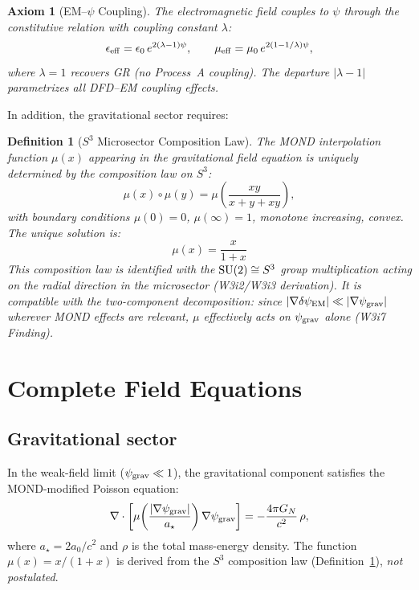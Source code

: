 \documentclass[11pt]{article}
\newtheorem{definition}{Definition}
\newtheorem{axiom}{Axiom}
\newcommand{\psigrav}{\psi_{\rm grav}}
\newcommand{\dpsiEM}{\delta\psi_{\rm EM}}
\newcommand{\GN}{G_N}
\newcommand{\aM}{a_0}
\newcommand{\lamdiff}{|\lambda{-}1|}
\newcommand{\mufd}{\mu}
\begin{document}
\begin{axiom}[EM--$\psi$ Coupling]
\label{ax:coupling}
The electromagnetic field couples to $\psi$ through the constitutive
relation with coupling constant $\lambda$:
\begin{equation}
\epsilon_{\rm eff} = \epsilon_0\,e^{2(\lambda-1)\psi}, \qquad
\mu_{\rm eff} = \mu_0\,e^{2(1-1/\lambda)\psi},
\label{eq:constitutive}
\end{equation}
where $\lambda = 1$ recovers GR (no Process~A coupling). The departure
$\lamdiff$ parametrizes all DFD--EM coupling effects.
\end{axiom}

\noindent In addition, the gravitational sector requires:

\begin{definition}[$S^3$ Microsector Composition Law]
\label{def:S3}
The MOND interpolation function $\mufd(x)$ appearing in the gravitational
field equation is uniquely determined by the composition law on $S^3$:
\begin{equation}
\mufd(x) \circ \mufd(y) = \mufd\!\left(\frac{xy}{x+y+xy}\right),
\end{equation}
with boundary conditions $\mufd(0) = 0$, $\mufd(\infty) = 1$,
monotone increasing, convex. The unique solution is:
\begin{equation}
\boxed{\mufd(x) = \frac{x}{1+x}}
\label{eq:mu-simple}
\end{equation}
This composition law is identified with the ${\rm SU}(2) \cong S^3$
group multiplication acting on the radial direction in the microsector
(W3i2/W3i3 derivation). It is compatible with the two-component
decomposition: since $|\nabla\dpsiEM| \ll |\nabla\psigrav|$ wherever
MOND effects are relevant, $\mufd$ effectively acts on $\psigrav$
alone (W3i7 Finding).
\end{definition}


\section{Complete Field Equations}
\label{sec:field-equations}

\subsection{Gravitational sector}

In the weak-field limit ($\psigrav \ll 1$), the gravitational component
satisfies the MOND-modified Poisson equation:
\begin{equation}
\nabla\cdot\left[\mufd\!\left(\frac{|\nabla\psigrav|}{a_\star}\right)
\nabla\psigrav\right] = -\frac{4\pi\GN}{c^2}\,\rho,
\label{eq:grav-Poisson}
\end{equation}
where $a_\star = 2\aM/c^2$ and $\rho$ is the total mass-energy density.
The function $\mufd(x) = x/(1+x)$ is derived from the $S^3$ composition
law (Definition~\ref{def:S3}), \emph{not postulated}.
\end{document}
